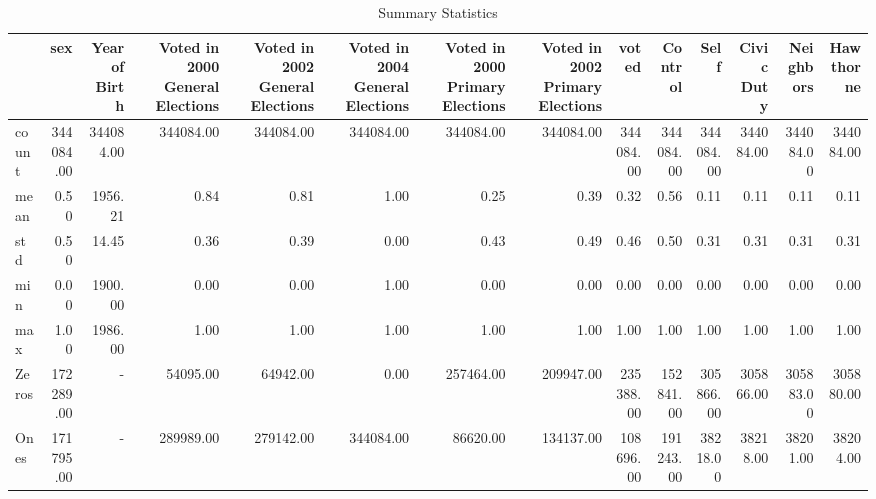 \begin{table}
\caption{Summary Statistics}
\label{tab:summary_stats}
\begin{tabular}{lrrrrrrrrrrrrr}
\toprule
 & sex & Year of Birth & Voted in 2000 General Elections & Voted in 2002 General Elections & Voted in 2004 General Elections & Voted in 2000 Primary Elections & Voted in 2002 Primary Elections & voted & Control & Self & Civic Duty & Neighbors & Hawthorne \\
\midrule
count & 344084.00 & 344084.00 & 344084.00 & 344084.00 & 344084.00 & 344084.00 & 344084.00 & 344084.00 & 344084.00 & 344084.00 & 344084.00 & 344084.00 & 344084.00 \\
mean & 0.50 & 1956.21 & 0.84 & 0.81 & 1.00 & 0.25 & 0.39 & 0.32 & 0.56 & 0.11 & 0.11 & 0.11 & 0.11 \\
std & 0.50 & 14.45 & 0.36 & 0.39 & 0.00 & 0.43 & 0.49 & 0.46 & 0.50 & 0.31 & 0.31 & 0.31 & 0.31 \\
min & 0.00 & 1900.00 & 0.00 & 0.00 & 1.00 & 0.00 & 0.00 & 0.00 & 0.00 & 0.00 & 0.00 & 0.00 & 0.00 \\
max & 1.00 & 1986.00 & 1.00 & 1.00 & 1.00 & 1.00 & 1.00 & 1.00 & 1.00 & 1.00 & 1.00 & 1.00 & 1.00 \\
Zeros & 172289.00 & - & 54095.00 & 64942.00 & 0.00 & 257464.00 & 209947.00 & 235388.00 & 152841.00 & 305866.00 & 305866.00 & 305883.00 & 305880.00 \\
Ones & 171795.00 & - & 289989.00 & 279142.00 & 344084.00 & 86620.00 & 134137.00 & 108696.00 & 191243.00 & 38218.00 & 38218.00 & 38201.00 & 38204.00 \\
\bottomrule
\end{tabular}
\end{table}
